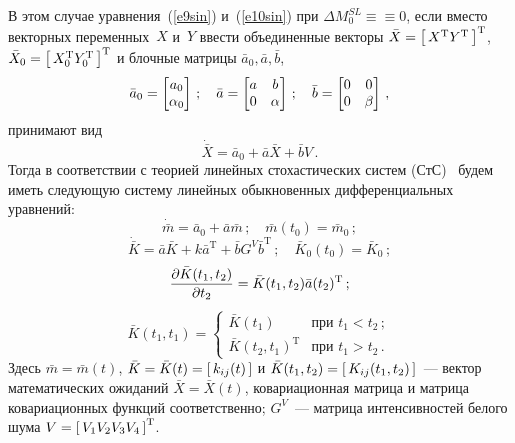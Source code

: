 \begin{multicols}{2}
В этом случае уравнения~(\ref{e9sin}) и~(\ref{e10sin}) при $\Delta M_0^{SL} \equiv$\linebreak $\equiv 0$,  
если вместо векторных переменных~$X$ и~$Y$ ввести объединенные векторы $\bar X =\left[\, X^{\mathrm{T}} Y^{\mathrm{T}}\,\right]^{\mathrm{T}}$,
$\bar X_0 =\left[\, X_0^{\mathrm{T}} Y_0^{\mathrm{T}}\,\right]^{\mathrm{T}}$ и блочные матрицы $\bar a_0, \bar a, \bar b$,
    $$
    \bar a_0 =
    \begin{bmatrix}
     a_0\cr \alpha_0
     \end{bmatrix}\,;
     \quad 
     \bar a =
    \begin{bmatrix}
    a&b\\ 0&\alpha\\
    \end{bmatrix}\,;\quad 
    \bar b=
    \begin{bmatrix}
    0&0\\ 0&\beta
    \end{bmatrix}\,,
$$
принимают вид
\begin{equation}
{\dot{\bar X}} =\bar a_0 +\bar a \bar X + \bar b V\,.
\label{e30sin}
\end{equation}
Тогда в соответствии с теорией линейных стохастических систем (СтС)~\cite{7sin, 8sin} будем иметь следующую
систему линейных обыкновенных дифференциальных уравнений:
\begin{equation}
{\dot{\bar m}} =\bar a_0 + \bar a \bar m\,;\quad \bar m (t_0) =\bar m_0\,;
\label{e31sin}
\end{equation}
\begin{equation}
{\dot{\bar K}} = \bar a \bar K + k\bar a^{\mathrm{T}} +\bar b G^V \bar b^{\mathrm{T}}\,;\quad \bar K_0 (t_0) =\bar K_0\,;
\label{e32sin}
\end{equation}
\begin{equation*}
\displaystyle\frac{\displaystyle \partial \bar K (t_1, t_2)\mathstrut}{\displaystyle \partial t_2\mathstrut} =\bar K (t_1, t_2) \bar a (t_2)^{\mathrm{T}}\,;
\end{equation*}
\begin{equation}
\bar K(t_1, t_1) =
\begin{cases}
\bar K (t_1) &\mbox{при\ \ } t_1< t_2\,;\\[6pt]
\bar K(t_2, t_1)^{\mathrm{T}} &\mbox{при\ \ } t_1> t_2\,.
\end{cases}
\label{e33sin}
\end{equation}
Здесь $\bar m = \bar m(t)$, $ \bar K = \bar K(t)= \left[\, k_{ij} (t)\,\right]$ и $\bar K(t_1, t_2)=\left[\, K_{ij}(t_1,t_2)\,\right]$~--- 
вектор математических ожиданий $\bar X = \bar X(t)$, ковариационная матрица и матрица
ковариационных функций соответственно; $G^V$~--- матрица интенсивностей белого шума $V= \left[\, V_1 V_2 V_3 V_4\,\right]^{\mathrm{T}}$.


\end{multicols}
